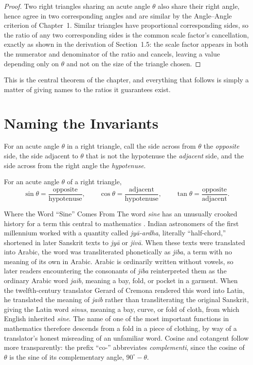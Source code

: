\begin{proof}
Two right triangles sharing an acute angle $\theta$ also share their right
angle, hence agree in two corresponding angles and are similar by the
Angle--Angle criterion of Chapter~1. Similar triangles have proportional
corresponding sides, so the ratio of any two corresponding sides is the
common scale factor's cancellation, exactly as shown in the derivation of
Section~1.5: the scale factor appears in both the numerator and denominator
of the ratio and cancels, leaving a value depending only on $\theta$ and not
on the size of the triangle chosen.
\end{proof}

This is the central theorem of the chapter, and everything that follows is
simply a matter of giving names to the ratios it guarantees exist.

\section{Naming the Invariants}

For an acute angle $\theta$ in a right triangle, call the side across from
$\theta$ the \emph{opposite} side, the side adjacent to $\theta$ that is not
the hypotenuse the \emph{adjacent} side, and the side across from the right
angle the \emph{hypotenuse}.

\begin{definition}
For an acute angle $\theta$ of a right triangle,
\[
\sin\theta = \frac{\text{opposite}}{\text{hypotenuse}}, \qquad
\cos\theta = \frac{\text{adjacent}}{\text{hypotenuse}}, \qquad
\tan\theta = \frac{\text{opposite}}{\text{adjacent}}.
\]
\end{definition}

\begin{historicalnote}{Where the Word ``Sine'' Comes From}
The word \emph{sine} has an unusually crooked history for a term this
central to mathematics \cite{boyer1991}. Indian astronomers of the first
millennium worked with a quantity called \emph{jy\={a}-ardha}, literally
``half-chord,'' shortened in later Sanskrit texts to \emph{jy\={a}} or
\emph{jiv\={a}}. When these texts were translated into Arabic, the word
was transliterated phonetically as \emph{jiba}, a term with no meaning of
its own in Arabic. Arabic is ordinarily written without vowels, so later
readers encountering the consonants of \emph{jiba} reinterpreted them as
the ordinary Arabic word \emph{jaib}, meaning a bay, fold, or pocket in a
garment. When the twelfth-century translator Gerard of Cremona rendered
this word into Latin, he translated the meaning of \emph{jaib} rather
than transliterating the original Sanskrit, giving the Latin word
\emph{sinus}, meaning a bay, curve, or fold of cloth, from which English
inherited \emph{sine}. The name of one of the most important functions in
mathematics therefore descends from a fold in a piece of clothing, by way
of a translator's honest misreading of an unfamiliar word.
Cosine and cotangent follow more transparently: the prefix ``co-''
abbreviates \emph{complementi}, since the cosine of $\theta$ is the sine
of its complementary angle, $90^\circ - \theta$.
\end{historicalnote}

